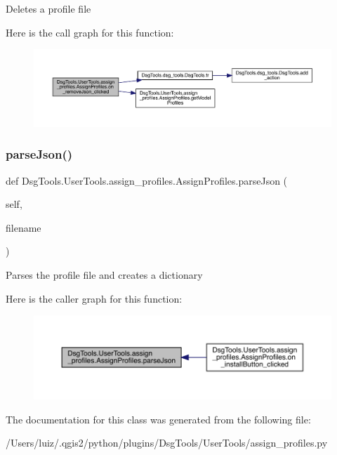 \begin{DoxyVerb}Deletes a profile file
\end{DoxyVerb}
 Here is the call graph for this function\+:
\nopagebreak
\begin{figure}[H]
\begin{center}
\leavevmode
\includegraphics[width=350pt]{class_dsg_tools_1_1_user_tools_1_1assign__profiles_1_1_assign_profiles_aab8b73d37d5f05c22f96d45661facd38_cgraph}
\end{center}
\end{figure}
\mbox{\label{class_dsg_tools_1_1_user_tools_1_1assign__profiles_1_1_assign_profiles_aa1437028740f782813e3d7f1533aa2c7}} 
\subsubsection{\texorpdfstring{parse\+Json()}{parseJson()}}
{\footnotesize\ttfamily def Dsg\+Tools.\+User\+Tools.\+assign\+\_\+profiles.\+Assign\+Profiles.\+parse\+Json (\begin{DoxyParamCaption}\item[{}]{self,  }\item[{}]{filename }\end{DoxyParamCaption})}

\begin{DoxyVerb}Parses the profile file and creates a dictionary
\end{DoxyVerb}
 Here is the caller graph for this function\+:
\nopagebreak
\begin{figure}[H]
\begin{center}
\leavevmode
\includegraphics[width=350pt]{class_dsg_tools_1_1_user_tools_1_1assign__profiles_1_1_assign_profiles_aa1437028740f782813e3d7f1533aa2c7_icgraph}
\end{center}
\end{figure}


The documentation for this class was generated from the following file\+:\begin{DoxyCompactItemize}
\item 
/\+Users/luiz/.\+qgis2/python/plugins/\+Dsg\+Tools/\+User\+Tools/assign\+\_\+profiles.\+py\end{DoxyCompactItemize}
